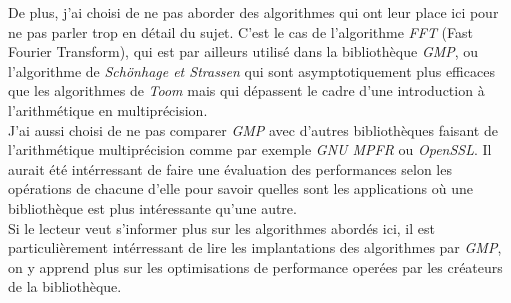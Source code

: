 \documentclass[letterpaper]{article}
\begin{document}
De plus, j'ai choisi de ne pas aborder des algorithmes qui ont leur place
ici pour ne pas parler trop en détail du sujet. C'est le cas de l'algorithme
\emph{FFT} (Fast Fourier Transform), qui est par ailleurs utilisé dans
la bibliothèque \emph{GMP}, ou l'algorithme de \emph{Schönhage et Strassen} qui
sont asymptotiquement plus efficaces que les algorithmes de \emph{Toom} mais
qui dépassent le cadre d'une introduction à l'arithmétique en multiprécision.\\

J'ai aussi choisi de ne pas comparer \emph{GMP} avec d'autres bibliothèques
faisant de l'arithmétique multiprécision comme par exemple \emph{GNU MPFR} ou
\emph{OpenSSL}. Il aurait été intérressant de faire une évaluation des
performances selon les opérations de chacune d'elle pour savoir quelles sont les
applications où une bibliothèque est plus intéressante qu'une autre.\\

Si le lecteur veut s'informer plus sur les algorithmes abordés ici, il est
particulièrement intérressant de lire les implantations des algorithmes par
\emph{GMP}, on y apprend plus sur les optimisations de performance
operées par les créateurs de la bibliothèque.



\end{document}
